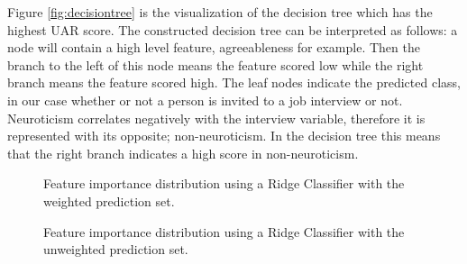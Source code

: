 Figure \ref{fig:decisiontree} is the visualization of the decision tree which has the highest UAR score. The constructed decision tree can be interpreted as follows: a node will contain a high level feature, agreeableness for example. Then the branch to the left of this node means the feature scored low while the right branch means the feature scored high. The leaf nodes indicate the predicted class, in our case whether or not a person is invited to a job interview or not. Neuroticism correlates negatively with the interview variable, therefore it is represented with its opposite; non-neuroticism. In the decision tree this means that the right branch indicates a high score in non-neuroticism. 
\begin{figure*}[h]
  \centering
  
  \caption{Decision Tree of the personality traits, arousal and valence dimensions, predicting the interview invitation variable.}
  \label{fig:decisiontree}
\end{figure*}

\begin{figure}[h]
  \centering
  
  \caption{Feature importance distribution using a Ridge Classifier with the weighted prediction set.}
  \label{fig:featureimp_weighted}
\end{figure}

\begin{figure}[h]
  \centering
  
  \caption{Feature importance distribution using a Ridge Classifier with the unweighted prediction set.}
  \label{fig:featureimp_unweighted}
\end{figure}